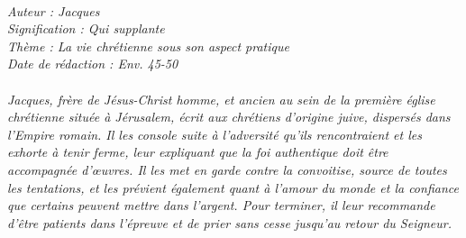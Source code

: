 \BFont
\noindent\hrulefill
{\footnotesize
\textit{
\bigskip
{\centering{}
\\Auteur : Jacques
\\Signification : Qui supplante
\\Thème : La vie chrétienne sous son aspect pratique
\\Date de rédaction : Env. 45-50\\}
}
\textit{
\\Jacques, frère de Jésus-Christ homme, et ancien au sein de la première église chrétienne située à Jérusalem, écrit aux chrétiens d’origine juive, dispersés dans l’Empire romain. Il les console suite à l’adversité qu’ils rencontraient et les exhorte à tenir ferme, leur expliquant que la foi authentique doit être accompagnée d’œuvres. Il les met en garde contre la convoitise, source de toutes les tentations, et les prévient également quant à l’amour du monde et la confiance que certains peuvent mettre dans l’argent. Pour terminer, il leur recommande d'être patients dans l’épreuve et de prier sans cesse jusqu’au retour du Seigneur.\bigskip
}
}
\par\nobreak\noindent\hrulefill
